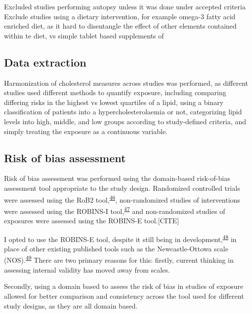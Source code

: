 \documentclass[a4paper, twoside]{templates/ociamthesis}
\begin{document}
Excluded studies performing autopsy unless it was done under accepted criteria Exclude studies using a dietary intervention, for example omega-3 fatty acid enriched diet, as it hard to disentangle the effect of other elements contained within te diet, vs simple tablet based supplements of

\hypertarget{data-extraction}{%
\subsection{Data extraction}\label{data-extraction}}

Harmonization of cholesterol measures across studies was performed, as different studies used different methods to quantify exposure, including comparing differing risks in the highest vs lowest quartiles of a lipid, using a binary classification of patients into a hypercholesterolaemia or not, categorizing lipid levels into high, middle, and low groups according to study-defined criteria, and simply treating the exposure as a continuous variable.

\hypertarget{risk-of-bias}{%
\subsection{Risk of bias assessment}\label{risk-of-bias}}

Risk of bias assessment was performed using the domain-based risk-of-bias assessment tool appropriate to the study design. Randomized controlled trials were assessed using the RoB2 tool,\textsuperscript{\protect\hyperlink{ref-sterne2019}{46}}, non-randomized studies of interventions were assessed using the ROBINS-I tool,\textsuperscript{\protect\hyperlink{ref-sterne2016}{47}} and non-randomized studies of exposures were assessed using the ROBINS-E tool.{[}CITE{]}

I opted to use the ROBINS-E tool, despite it still being in development,\textsuperscript{\protect\hyperlink{ref-morganr2020}{48}} in place of other existing published tools such as the Newcastle-Ottowa scale (NOS).\textsuperscript{\protect\hyperlink{ref-wells2000newcastle}{49}} There are two primary reasons for this: firstly, current thinking in assessing internal validity has moved away from scales.

Secondly, using a domain based to assess the risk of bias in studies of exposure allowed for better comparison and consistency across the tool used for different study designs, as they are all domain based.
\end{document}
